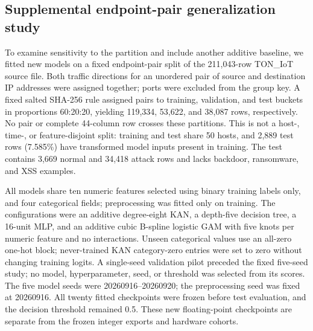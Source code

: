\subsection{Supplemental endpoint-pair generalization study}
\label{sec:pair-stage2}
To examine sensitivity to the partition and include another additive baseline,
we fitted new models on a fixed endpoint-pair split of the 211,043-row TON\_IoT
source file. Both traffic directions for an unordered pair of source and
destination IP addresses were assigned together; ports were excluded from the
group key. A fixed salted SHA-256 rule assigned pairs to training, validation,
and test buckets in proportions 60:20:20, yielding 119,334, 53,622, and 38,087
rows, respectively. No pair or complete 44-column row crosses these partitions.
This is not a host-, time-, or feature-disjoint split: training and test share
50 hosts, and 2,889 test rows (7.585\%) have transformed model inputs present in
training. The test contains 3,669 normal and 34,418 attack rows and lacks
backdoor, ransomware, and XSS examples.

All models share ten numeric features selected using binary training labels
only, and four categorical fields; preprocessing was fitted only on training. The configurations
were an additive degree-eight KAN, a depth-five decision tree, a 16-unit MLP,
and an additive cubic B-spline logistic GAM with five knots per numeric feature
and no interactions. Unseen categorical values use an all-zero one-hot block;
never-trained KAN category-zero entries were set to zero without changing
training logits. A single-seed validation pilot preceded the fixed five-seed
study; no model, hyperparameter, seed, or threshold was selected from its scores.
The five model seeds were 20260916--20260920; the preprocessing seed was fixed
at 20260916. All twenty fitted checkpoints were frozen before test evaluation,
and the decision threshold remained 0.5. These new floating-point checkpoints
are separate from the frozen integer exports and hardware cohorts.

